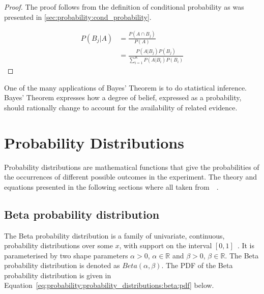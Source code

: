 \begin{proof}
      The proof follows from the definition of conditional probability as was presented in \ref{sec:probability:cond_probability}.

      \begin{equation}
            \begin{split}
                  P(B_{j} \vert A)
                  &= \frac{P(A \cap B_{j})}{P(A)}\\
                  &= \frac{P(A \vert B_{j})P(B_{j})}{\sum_{i=1}^{K} P(A \vert B_{i})P(B_{i})}
            \end{split}
      \end{equation}
\end{proof}

\noindent
One of the many applications of Bayes' Theorem is to do statistical inference. Bayes' Theorem expresses how a degree of belief, expressed as a probability, should rationally change to account for the availability of related evidence.


\section{Probability Distributions}\label{sec:probability:probability_distributions}

Probability distributions are mathematical functions that give the probabilities of the occurrences of different possible outcomes in the experiment. The theory and equations presented in the following sections where all taken from~\citeauthor{ref:wackerly:2014}~\cite{ref:wackerly:2014}.


\subsection{Beta probability distribution}\label{sec:probability:probability_distributions:beta}

The Beta probability distribution is a family of univariate, continuous, probability distributions over some $x$, with support on the interval $[0,1]$~\cite{ref:wackerly:2014}. It is parameterised by two shape parameters $\alpha > 0$, $\alpha \in \mathbb{R}$ and $\beta > 0$, $\beta \in \mathbb{R}$. The Beta probability distribution is denoted as $Beta(\alpha, \beta)$. The \acf{PDF} of the Beta probability distribution is given in Equation~\eqref{eq:probability:probability_distributions:beta:pdf} below.

